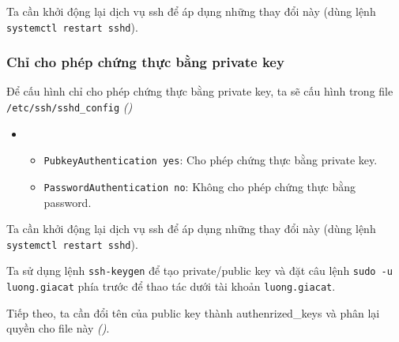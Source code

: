 Ta cần khởi động lại dịch vụ ssh để áp dụng những thay đổi này (dùng lệnh \texttt{systemctl restart sshd}).

\subsubsection{Chỉ cho phép chứng thực bằng private key}

Để cấu hình chỉ cho phép chứng thực bằng private key, ta sẽ cấu hình trong file \texttt{/etc/ssh/sshd\_config} \textit{()}


\begin{itemize}[label={}]
  \item
        \begin{itemize}[label={--}]
          \item \texttt{PubkeyAuthentication yes}: Cho phép chứng thực bằng private key.
          \item \texttt{PasswordAuthentication no}: Không cho phép chứng thực bằng password.
        \end{itemize}
\end{itemize}

Ta cần khởi động lại dịch vụ ssh để áp dụng những thay đổi này (dùng lệnh \texttt{systemctl restart sshd}).

Ta sử dụng lệnh \texttt{ssh-keygen} để tạo private/public key và đặt câu lệnh \texttt{sudo -u luong.giacat} phía trước để thao tác dưới tài khoản \texttt{luong.giacat}.


Tiếp theo, ta cần đổi tên của public key thành authenrized\_keys và phân lại quyền
cho file này \textit{()}.




